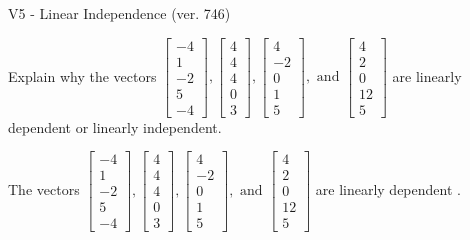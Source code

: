 \begin{exercise}
  \begin{exerciseTitle}V5 - Linear Independence (ver. 746)\end{exerciseTitle}
  \begin{exerciseStatement}
    Explain why the vectors \(\left[\begin{array}{r}
-4 \\
1 \\
-2 \\
5 \\
-4
\end{array}\right] , \left[\begin{array}{r}
4 \\
4 \\
4 \\
0 \\
3
\end{array}\right] , \left[\begin{array}{r}
4 \\
-2 \\
0 \\
1 \\
5
\end{array}\right] , \text{ and } \left[\begin{array}{r}
4 \\
2 \\
0 \\
12 \\
5
\end{array}\right]\) are linearly dependent or linearly independent.	


  \end{exerciseStatement}
  \begin{exerciseAnswer}
   The vectors \(\left[\begin{array}{r}
-4 \\
1 \\
-2 \\
5 \\
-4
\end{array}\right] , \left[\begin{array}{r}
4 \\
4 \\
4 \\
0 \\
3
\end{array}\right] , \left[\begin{array}{r}
4 \\
-2 \\
0 \\
1 \\
5
\end{array}\right] , \text{ and } \left[\begin{array}{r}
4 \\
2 \\
0 \\
12 \\
5
\end{array}\right]\) are 
  	 linearly dependent  .
  


  \end{exerciseAnswer}
\end{exercise}